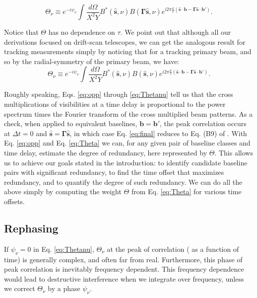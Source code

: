 \documentclass[twocolumn,apj,numberedappendix]{emulateapj}
\renewcommand\[{\begin{equation}}
\renewcommand\]{\end{equation}}
\begin{document}
\[
\Theta_{\nu} \equiv e^{-i\psi_{\nu}} \int \frac{d\Omega}{X^{2}Y}B^{*}(\hat{\boldsymbol{s}},\nu)B(\boldsymbol{\Gamma}\hat{\boldsymbol{s}},\nu) e^{i2\pi\frac{\nu}{c}\left(\hat{\boldsymbol{s}}\cdot\boldsymbol{b}-\boldsymbol{\Gamma}\hat{\boldsymbol{s}}\cdot\boldsymbol{b'}\right)}.
\label{eq:Thetanu}
\]


Notice that $\Theta$ has no dependence on $\tau$. We point out that although all our derivations focused on drift-scan telescopes, we can get the analogous result for tracking measurements simply by noticing that for a tracking primary beam, and so by the radial-symmetry of the primary beam, we have:
\[
\Theta_{\nu} \equiv e^{-i\psi_{\nu}} \int \frac{d\Omega}{X^{2}Y}B^{*}(\hat{\boldsymbol{s}},\nu)B(\hat{\boldsymbol{s}},\nu) e^{i2\pi\frac{\nu}{c}\left(\hat{\boldsymbol{s}}\cdot\boldsymbol{b}-\boldsymbol{\Gamma}\hat{\boldsymbol{s}}\cdot\boldsymbol{b'}\right)}.
\label{eq:Thetanu_tracking}
\]

Roughly speaking, Eqs. \eqref{eq:opp} through \eqref{eq:Thetanu} tell us that the cross multiplications of visibilities at a time delay is proportional to the power spectrum times the Fourier
transform of the cross multiplied beam patterns. As a check, when applied to equivalent baselines,
$\boldsymbol{b}=\boldsymbol{b'}$, the peak correlation occurs at $\Delta t=0$ and $\hat{\boldsymbol{s}}=\boldsymbol{\Gamma}\hat{\boldsymbol{s}}$, in which case Eq. \eqref{eq:final} reduces to Eq. (B9) of \cite{paper32}. 
With Eq. \eqref{eq:opp} and Eq. \eqref{eq:Theta} we can, for any given pair of baseline classes and time delay, estimate the degree of redundancy, here represented by $\Theta$. This allows us to achieve our goals stated in the introduction: to identify 
candidate baseline pairs with significant redundancy, to find the time offset that maximizes redundancy, and to quantify the degree of such redundancy. We can do all the above simply by computing the weight $\Theta$ from
Eq. \eqref{eq:Theta} for various time offsets. 



\subsection{Rephasing \label{sec:rephs}}
If $\psi_{\nu}=0$ in  Eq. \eqref{eq:Thetanu}, $\Theta_{\nu}$ at the peak of correlation ( as a function of time) is generally complex, and often far from real. Furthermore, this phase of peak correlation is inevitably frequency dependent. This frequency dependence would lead to destructive interference when we integrate over frequency, unless we correct $\Theta_{\nu}$ by a phase $\psi_\nu$. 
\end{document}

